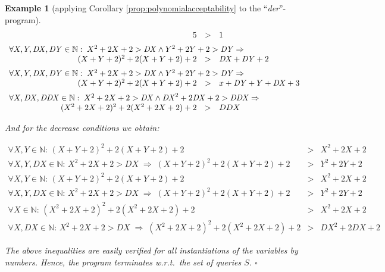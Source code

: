 \documentclass[envcountsame]{tlp}
\newcounter{ex:der-lastsymconsctr}
\newtheorem{example}{Example}
\begin{document}
\begin{example}[applying Corollary \ref{prop:polynomialacceptability} to the
``\textit{der}''-program]
{\small
\[\begin{array}{rcl}
   \hspace*{8cm} 5 &>& 1 \vspace*{.2cm}\\
\multicolumn{3}{l}{\forall X,Y,\mathit{DX},\mathit{DY} \in \mathbb{N}: \; X^2 +2 X + 2 > \mathit{DX}
\wedge Y^2 + 2 Y + 2
 > \mathit{DY} \Rightarrow}\\
 (X+Y+2)^2 + 2 (X + Y + 2) + 2 &>&
\mathit{DX}+\mathit{DY} + 2 \vspace*{.2cm} \\
\multicolumn{3}{l}{\forall X,Y,\mathit{DX},\mathit{DY} \in \mathbb{N}: \;
X^2 +2 X + 2 > \mathit{DX}
\wedge Y^2 + 2 Y + 2
 > \mathit{DY} \Rightarrow}\\
 (X+Y+2)^2 + 2 (X + Y + 2) + 2 &>&
x + \mathit{DY}+ Y + \mathit{DX} + 3 \vspace*{.2cm} \\
 \multicolumn{3}{l}{\forall X,\mathit{DX},\mathit{DDX} \in \mathbb{N}: \;
X^2 +2 X + 2 > \mathit{DX}
\wedge
\mathit{DX}^2 +2 \mathit{DX} + 2 > \mathit{DDX}  \Rightarrow}\\
(X^2 + 2 X + 2)^2 + 2 (X^2 + 2 X + 2) + 2
&>& DDX
\end{array}\]}

\vspace*{-.2cm}



\noindent
And for the decrease conditions we obtain:


\vspace*{-.3cm}



{\scriptsize
\[\begin{array}{rcl}
 \forall X,Y \in \mathbb{N}: \, (X+Y+2)^2 + 2 (X + Y + 2 ) + 2 &>& X^2 + 2 X + 2 \\
 \forall X,Y,\mathit{DX} \in \mathbb{N}: \,
 X^2 + 2 X + 2 > \mathit{DX} \;
\Rightarrow \;
(X+Y+ 2)^2 + 2 (X + Y + 2) + 2&>& Y^2 + 2 Y + 2\\
 \forall X,Y \in \mathbb{N}:  \, (X+Y+2)^2 + 2 (X + Y + 2 ) + 2 &>& X^2 + 2 X + 2\\
\forall X,Y,\mathit{DX} \in  \mathbb{N}: \,
X^2 + 2 X + 2 > \mathit{DX} \;
\Rightarrow \;
(X+Y+ 2)^2 + 2 (X + Y + 2) + 2&>& Y^2 + 2 Y + 2\\
 \forall X \in\mathbb{N}: \,
(X^2 + 2 X + 2)^2 + 2 (X^2 + 2 X + 2) + 2 
&>& X^2 + 2 X + 2\\
 \forall X,\mathit{DX} \in \mathbb{N}: \,
X^2 + 2 X + 2 > \mathit{DX} \;\Rightarrow \;
(X^2 + 2 X + 2)^2 + 2 (X^2 + 2 X + 2) + 2 &>& \mathit{DX}^2 + 2 \mathit{DX} + 2
\end{array}\]}


\vspace*{-.2cm}


The above inequalities are easily
verified for all instantiations of the variables by numbers. 
Hence, the program terminates w.r.t.\ the set of queries $S$. {\hfill{$\square$}}
\end{example}
\end{document}
